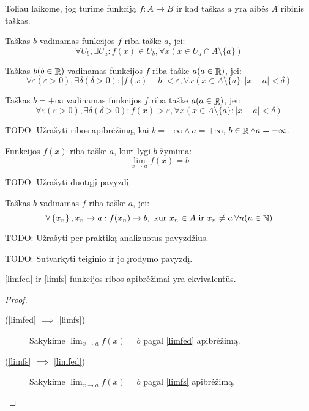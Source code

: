 Toliau laikome, jog turime funkciją $f : A \to B$ ir kad taškas $a$ 
yra aibės $A$ ribinis taškas.

\begin{defn}
  \label{limfed}
  Taškas $b$ vadinamas funkcijos $f$ riba taške $a$, jei:
  \[
  \forall U_b, \exists U_a : f(x) \in U_b,%
  \forall x (x \in U_a \cap A \setminus \{a\})
  \]
\end{defn}

\begin{defn}
  Taškas $b (b \in \mathop{\mathbb{R}})$ vadinamas funkcijos $f$ riba taške 
  $a (a \in \mathop{\mathbb{R}})$, jei:
  \[
  \forall \varepsilon (\varepsilon > 0), \exists \delta (\delta > 0):%
  |f(x) - b| < \varepsilon,%
  \forall x (x \in A \setminus \{a\} : |x - a| < \delta)
  \]
\end{defn}

\begin{defn}
  Taškas $b = +\infty$ vadinamas funkcijos $f$ riba taške $a (a \in \mathop{\mathbb{R}})$,
  jei:
  \[
  \forall \varepsilon (\varepsilon > 0), \exists \delta (\delta > 0) :%
  f(x) > \varepsilon,%
  \forall x (x \in A \setminus \{a\} : |x - a| < \delta)
  \]
\end{defn}

TODO: Užrašyti ribos apibrėžimą, kai $b=-\infty \land a=+\infty$, 
$b \in \mathop{\mathbb{R}} \land a=-\infty$.

\begin{notation}
  Funkcijos $f(x)$ riba taške $a$, kuri lygi $b$ žymima:
  \[
  \lim _{x \to a} f(x) = b
  \]
\end{notation}

TODO: Užrašyti duotąjį pavyzdį.

\begin{defn}
  \label{limfs}
  Taškas $b$ vadinamas $f$ riba taške $a$, jei:
  \[
  \forall \left\{ x_{n} \right\}, x_{n} \to a :%
  f(x_{n}) \to b, \text{ kur } x_{n} \in A \text{ ir } x_{n} \neq a \:%
  \forall n (n \in \NSET)%
  \]
\end{defn}

TODO: Užrašyti per praktiką analizuotus pavyzdžius.

TODO: Sutvarkyti teiginio ir jo įrodymo pavyzdį.
\begin{prop}
  \ref{limfed} ir \ref{limfs} funkcijos ribos apibrėžimai yra ekvivalentūs.
  \begin{proof}
    \hfill \\
    \begin{description}
      \item[(\ref{limfed} $\implies$ \ref{limfs})] 
        Sakykime $\lim _{x \to a} f(x) = b$ pagal \ref{limfed} apibrėžimą.
      \item[(\ref{limfs} $\implies$ \ref{limfed})]
        Sakykime $\lim _{x \to a} f(x) = b$ pagal \ref{limfs} apibrėžimą.
    \end{description}
  \end{proof}
\end{prop}

